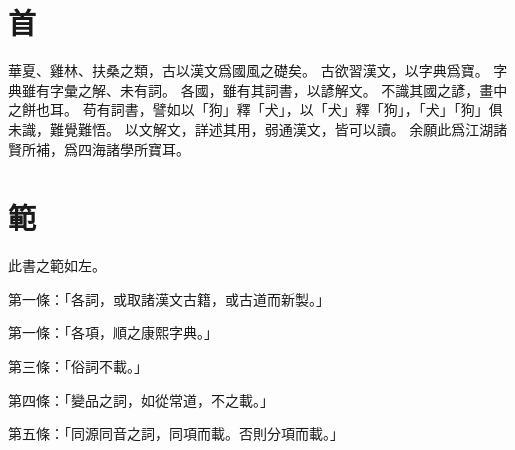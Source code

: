 \section{首}
華夏、雞林、扶桑之類，古以漢文爲國風之礎矣。
古欲習漢文，以字典爲寶。
字典雖有字彙之解、未有詞。
各國，雖有其詞書，以諺解文。
不識其國之諺，畫中之餅也耳。
苟有詞書，譬如以「狗」釋「犬」，以「犬」釋「狗」，「犬」「狗」俱未識，難覺難悟。
以文解文，詳述其用，弱通漢文，皆可以讀。
余願此爲江湖諸賢所補，爲四海諸學所寶耳。
\section{範}
此書之範如左。
\par 第一條：「各詞，或取諸漢文古籍，或古道而新製。」
\par 第一條：「各項，順之康熙字典。」
\par 第三條：「俗詞不載。」
\par 第四條：「變品之詞，如從常道，不之載。」
\par 第五條：「同源同音之詞，同項而載。否則分項而載。」
